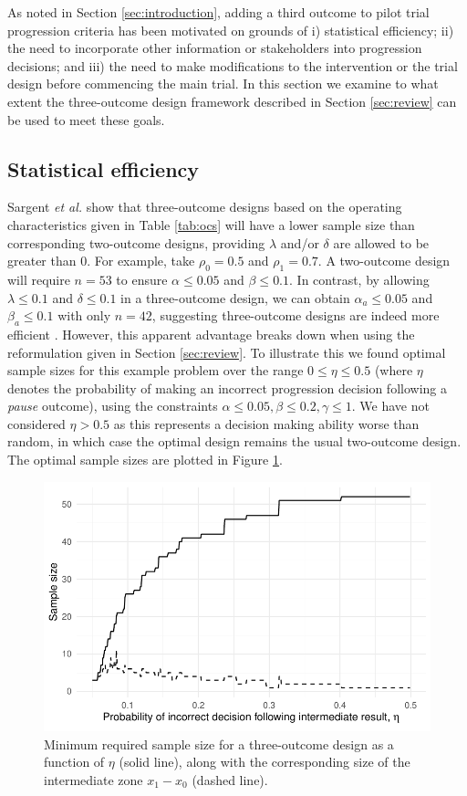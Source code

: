 \documentclass{bmcart}
\begin{document}
As noted in Section \ref{sec:introduction}, adding a third outcome to pilot trial progression criteria has been motivated on grounds of i) statistical efficiency; ii) the need to incorporate other information or stakeholders into progression decisions; and iii) the need to make modifications to the intervention or the trial design before commencing the main trial. In this section we examine to what extent the three-outcome design framework described in Section \ref{sec:review} can be used to meet these goals.

\subsection{Statistical efficiency}\label{sec:efficiency}

Sargent \emph{et al.} show that three-outcome designs based on the operating characteristics given in Table \ref{tab:ocs} will have a lower sample size than corresponding two-outcome designs, providing $\lambda$ and/or $\delta$ are allowed to be greater than 0. For example, take $\rho_0 = 0.5$ and $\rho_1 = 0.7$. A two-outcome design will require $n = 53$ to ensure $\alpha \leq 0.05$ and $\beta \leq 0.1$. In contrast, by allowing $\lambda \leq 0.1$ and $\delta \leq 0.1$ in a three-outcome design, we can obtain $\alpha_a \leq 0.05$ and $\beta_a \leq 0.1$ with only $n = 42$, suggesting three-outcome designs are indeed more efficient \cite{Sargent2001, Hong2007}. However, this apparent advantage breaks down when using the reformulation given in Section \ref{sec:review}. To illustrate this we found optimal sample sizes for this example problem over the range $0 \leq \eta \leq 0.5$ (where $\eta$ denotes the probability of making an incorrect progression decision following a \emph{pause} outcome), using the constraints $\alpha \leq 0.05, \beta \leq 0.2, \gamma \leq 1$. We have not considered $\eta > 0.5$ as this represents a decision making ability worse than random, in which case the optimal design remains the usual two-outcome design. The optimal sample sizes are plotted in Figure \ref{fig:eta_ns}.

\begin{figure}
\centering
\includegraphics[scale=0.8]{./figures/eta_ns}
\caption{Minimum required sample size for a three-outcome design as a function of $\eta$ (solid line), along with the corresponding size of the intermediate zone $x_1 - x_0$ (dashed line).}
\label{fig:eta_ns}
\end{figure}
\end{document}
